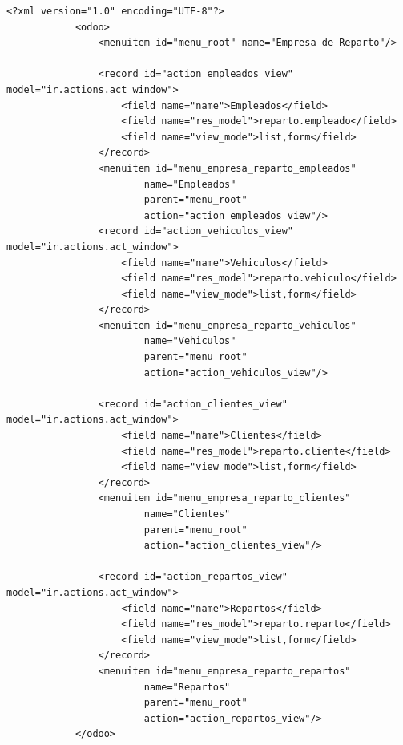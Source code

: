 \documentclass[a4paper, 11pt]{article}
\begin{document}
        \begin{lstlisting}[frame=single,breaklines=true]
            <?xml version="1.0" encoding="UTF-8"?>
            <odoo>
                <menuitem id="menu_root" name="Empresa de Reparto"/>

                <record id="action_empleados_view" model="ir.actions.act_window">
                    <field name="name">Empleados</field>
                    <field name="res_model">reparto.empleado</field>
                    <field name="view_mode">list,form</field>
                </record>
                <menuitem id="menu_empresa_reparto_empleados"
                        name="Empleados"
                        parent="menu_root"
                        action="action_empleados_view"/>
                <record id="action_vehiculos_view" model="ir.actions.act_window">
                    <field name="name">Vehiculos</field>
                    <field name="res_model">reparto.vehiculo</field>
                    <field name="view_mode">list,form</field>
                </record>
                <menuitem id="menu_empresa_reparto_vehiculos"
                        name="Vehiculos"
                        parent="menu_root"
                        action="action_vehiculos_view"/>

                <record id="action_clientes_view" model="ir.actions.act_window">
                    <field name="name">Clientes</field>
                    <field name="res_model">reparto.cliente</field>
                    <field name="view_mode">list,form</field>
                </record>
                <menuitem id="menu_empresa_reparto_clientes"
                        name="Clientes"
                        parent="menu_root"
                        action="action_clientes_view"/>

                <record id="action_repartos_view" model="ir.actions.act_window">
                    <field name="name">Repartos</field>
                    <field name="res_model">reparto.reparto</field>
                    <field name="view_mode">list,form</field>
                </record>
                <menuitem id="menu_empresa_reparto_repartos"
                        name="Repartos"
                        parent="menu_root"
                        action="action_repartos_view"/>
            </odoo>
        \end{lstlisting}
\end{document}
